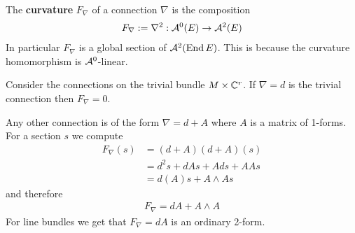 \begin{definition}
    The \textbf{curvature} $F_\nabla$ of a connection $\nabla$ is the composition \begin{align*}
        F_\nabla := \nabla^2:{\mathcal{A}}^0(E)\to{\mathcal{A}}^2(E)
    \end{align*} In particular $F_\nabla$ is a global section of ${\mathcal{A}}^2(\operatorname{End} E)$. This is because 
    the curvature homomorphism is ${\mathcal{A}}^0$-linear.
\end{definition}

\begin{example}
    Consider the connections on the trivial bundle $M\times \mathbb{C}^r$. If $\nabla = d$ is the
    trivial connection then $F_\nabla = 0$. 

    \hfill 

    Any other connection is of the form $\nabla = d + A$ where $A$ is a matrix of 1-forms. For a section
    $s$ we compute \begin{align*}
        F_\nabla(s) &= (d+A)(d+A)(s) \\
        &= d^2s + dAs + Ads + AAs \\
        &= d(A)s + A\wedge As
    \end{align*} and therefore \begin{align*}
        F_\nabla = dA + A\wedge A
    \end{align*}
    For line bundles we get that $F_\nabla = dA$ is an ordinary 2-form.
\end{example}